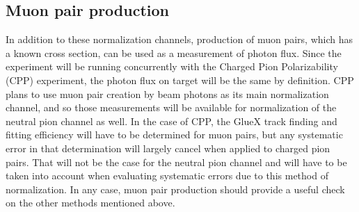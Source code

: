\subsection{Muon pair production}
In addition to these normalization channels, production of muon pairs,
which has a known cross section, can be used as a measurement of
photon flux. Since the experiment will be running concurrently with
the Charged Pion Polarizability (CPP) experiment, the photon flux on
target will be the same by definition. CPP plans to use muon pair
creation by beam photons as its main normalization channel, and so
those measurements will be available for normalization of the neutral
pion channel as well. In the case of CPP, the GlueX track finding and
fitting efficiency will have to be determined for muon pairs, but any
systematic error in that determination will largely cancel when
applied to charged pion pairs. That will not be the case for the
neutral pion channel and will have to be taken into account when
evaluating systematic errors due to this method of normalization. In
any case, muon pair production should provide a useful check on the
other methods mentioned above.
